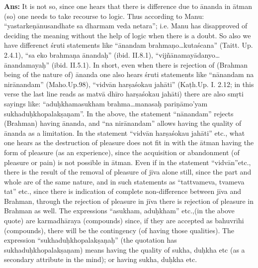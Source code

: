 \textbf{Ans:} It is not so, since one hears that there is difference due to ānanda in ātman (so) one needs to take recourse to logic. Thus according to Manu: “yastarkeṇānusandhate sa dharmam veda netara”; i.e. Manu has disapproved of deciding the meaning without the help of logic when there is a doubt. So also we have differenct śruti statements like “ānandam brahmaṇo…kutaścana” (Taitt. Up. 2.4.1),  “sa eko brahmaṇa ānandaḥ” (ibid. II.8.1),  “vijñānamayādanyo…ānandamayaḥ” (ibid. II.5.1). In short, even when there is rejection of (Brahman being of the nature of) ānanda one also hears śruti statements like “nānandam na nirānandam” (Maho.Up.98), “vidvān harṣaśokau jahāti” (Kaṭh.Up. I. 2.12; in this verse the last line reads as matvā dhīro harṣaśokau jahāti)  there are also smṛti sayings like: “aduḥkhamasukham brahma…manasaḥ pariṇāmo’yam sukhaduḥkhopalakṣaṇam”. In the above, the statement “nānandam” rejects (Brahman) having ānanda, and “na nirānandam” allows having the quality of ānanda as a limitation. In the statement “vidvān harṣaśokau jahāti” etc., what one hears as the destruction of pleasure does not fit in with the ātman having the form of pleasure (as an experience), since the acquisition or abandonment (of pleasure or pain) is not possible in ātman. Even if in the statement “vidvān”etc., there is the result of the removal of pleasure of jīva alone still, since the part and whole are of the same nature, and in such statements as “tattvameva, tvameva tat” etc., since there is indication of complete non-difference    between jīva and Brahman, through the rejection of pleasure in jīva there is rejection of pleasure in Brahman as well. The expressions “asukham, aduḥkham” etc.,(in the above quote) are karmadhāraya (compounds) since, if they are accepted as bahuvrīhi (compounds), there will be the contingency (of having those qualities). The expression “sukhaduḥkhopalakṣaṇaḥ” (the quotation has sukhaduḥkhopalakṣaṇam) means having the quality of sukha, duḥkha etc (as a secondary attribute in the mind); or having sukha, duḥkha etc. 

